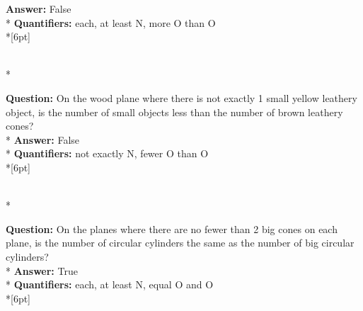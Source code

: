 \begin{figure*}
\begin{minipage}{0.48\textwidth}
\begin{minipage}[t][2.2cm][t]{1\textwidth}
      \textbf{Answer:} False \\*
      \textbf{Quantifiers:} each, at least N, more O than O\\*[6pt]
    \end{minipage}\\*
    \begin{minipage}[t][2.2cm][t]{1\textwidth}
      \footnotesize
      \textbf{Question:}  On the wood plane where there is not exactly 1 small yellow leathery object, is the number of small objects less than the number of brown leathery cones? \\*
      \textbf{Answer:}  False \\*
      \textbf{Quantifiers:}  not exactly N, fewer O than O \\*[6pt]
    \end{minipage}\\*
    \begin{minipage}[t][2.2cm][t]{1\textwidth}
      \footnotesize
      \textbf{Question:} On the planes where there are no fewer than 2 big cones on each plane, is the number of circular cylinders the same as the number of big circular cylinders? \\*
      \textbf{Answer:} True \\*
      \textbf{Quantifiers:} each, at least N, equal O and O \\*[6pt]
    \end{minipage}
  \end{minipage}
  \vspace{0.2cm}
  

\end{figure*}
